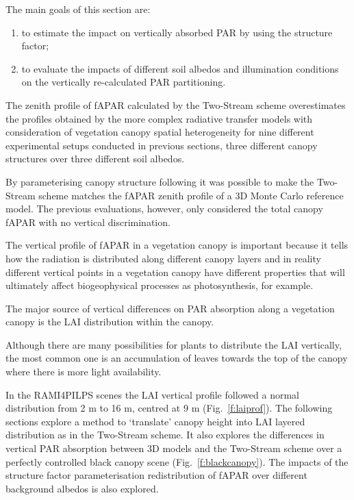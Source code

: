 \documentclass[a4paper,11pt]{report}
\begin{document}
The main goals of this section are:
\begin{enumerate}[i]
 \item to estimate the impact on vertically absorbed PAR by using the structure factor;
\item to evaluate the impacts of different soil albedos and illumination conditions on the vertically re-calculated PAR partitioning. 
\end{enumerate}

The zenith profile of fAPAR calculated by the Two-Stream scheme overestimates the profiles obtained by the more complex radiative transfer models with consideration of vegetation canopy spatial heterogeneity for nine different experimental setups conducted in previous sections, three different canopy structures over three different soil albedos. 

By parameterising canopy structure following \citet{pinty2006} it was possible to make the Two-Stream scheme matches the fAPAR zenith profile of a 3D Monte Carlo reference model. The previous evaluations, however, only considered the total canopy fAPAR with no vertical discrimination. 

The vertical profile of fAPAR in a vegetation canopy is important because it tells how the radiation is distributed along different canopy layers and in reality different vertical points in a vegetation canopy have different properties that will ultimately affect biogeophysical processes as photosynthesis, for example. 

The major source of vertical differences on PAR absorption along a vegetation canopy is the LAI distribution within the canopy. 

Although there are many possibilities for plants to distribute the LAI vertically, the most common one is an accumulation of leaves towards the top of the canopy where there is more light availability. 

In the RAMI4PILPS scenes the LAI vertical profile followed a normal distribution from 2 m to 16 m, centred at 9 m (Fig.~\ref{f:laiprof}). The following sections explore a method to `translate' canopy height into LAI layered distribution as in the Two-Stream scheme. It also explores the differences in vertical PAR absorption between 3D models and the Two-Stream scheme over a perfectly controlled black canopy scene (Fig.~\ref{f:blackcanopy}). The impacts of the structure factor parameterisation redistribution of fAPAR over different background albedos is also explored.
\end{document}
